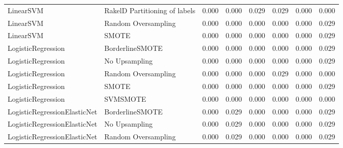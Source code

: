\begin{tabular}{llllllll}
                      LinearSVM & RakelD Partitioning of labels &     0.000 &                     0.000 &                 0.029 &                  0.029 &                                   0.000 &     0.000 \\
                      LinearSVM &           Random Oversampling &     0.000 &                     0.000 &                 0.000 &                  0.000 &                                   0.000 &     0.029 \\
                      LinearSVM &                         SMOTE &     0.000 &                     0.000 &                 0.000 &                  0.000 &                                   0.000 &     0.029 \\
             LogisticRegression &               BorderlineSMOTE &     0.000 &                     0.000 &                 0.000 &                  0.000 &                                   0.000 &     0.029 \\
             LogisticRegression &                 No Upsampling &     0.000 &                     0.000 &                 0.000 &                  0.000 &                                   0.000 &     0.029 \\
             LogisticRegression &           Random Oversampling &     0.000 &                     0.000 &                 0.000 &                  0.029 &                                   0.000 &     0.000 \\
             LogisticRegression &                         SMOTE &     0.000 &                     0.000 &                 0.000 &                  0.000 &                                   0.000 &     0.029 \\
             LogisticRegression &                      SVMSMOTE &     0.000 &                     0.000 &                 0.000 &                  0.000 &                                   0.000 &     0.000 \\
   LogisticRegressionElasticNet &               BorderlineSMOTE &     0.000 &                     0.029 &                 0.000 &                  0.000 &                                   0.000 &     0.029 \\
   LogisticRegressionElasticNet &                 No Upsampling &     0.000 &                     0.029 &                 0.000 &                  0.000 &                                   0.000 &     0.029 \\
   LogisticRegressionElasticNet &           Random Oversampling &     0.000 &                     0.029 &                 0.000 &                  0.000 &                                   0.000 &     0.029 \\

\end{tabular}
